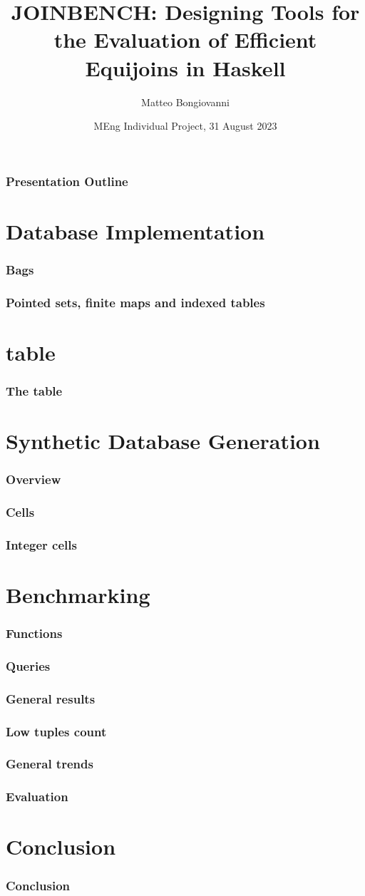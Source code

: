 \documentclass{beamer}
\title[JOINBENCH]{JOINBENCH: Designing Tools for the Evaluation of Efficient Equijoins in Haskell}
\author{Matteo Bongiovanni}
\date{MEng Individual Project, 31 August 2023}
\institute[JMC]{Joint Mathematics and Computing \\ Department of Computing}
\begin{document}
\frame{\titlepage}

\begin{frame}
\frametitle{Presentation Outline}
\tableofcontents
\end{frame}

\section{Database Implementation}
\begin{frame}
\frametitle{Bags}
\end{frame}

\begin{frame}
\frametitle{Pointed sets, finite maps and indexed tables}
\end{frame}

\section{ table}
\begin{frame}
\frametitle{The  table}
\end{frame}

\section{Synthetic Database Generation}
\begin{frame}
\frametitle{Overview}
\end{frame}

\begin{frame}
\frametitle{Cells}
\end{frame}

\begin{frame}
\frametitle{Integer cells}
\end{frame}

\section{Benchmarking}
\begin{frame}
\frametitle{Functions}
\end{frame}
\begin{frame}
\frametitle{Queries}
\end{frame}

\begin{frame}
\frametitle{General results}
\end{frame}

\begin{frame}
\frametitle{Low tuples count}
\end{frame}

\begin{frame}
\frametitle{General trends}
\end{frame}

\begin{frame}
\frametitle{Evaluation}
\end{frame}

\section{Conclusion}
\begin{frame}
\frametitle{Conclusion}
\end{frame}
\end{document}
